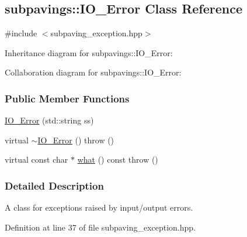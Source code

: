 \hypertarget{classsubpavings_1_1IO__Error}{\subsection{subpavings\-:\-:\-I\-O\-\_\-\-Error \-Class \-Reference}
\label{classsubpavings_1_1IO__Error}
}


{\ttfamily \#include $<$subpaving\-\_\-exception.\-hpp$>$}



\-Inheritance diagram for subpavings\-:\-:\-I\-O\-\_\-\-Error\-:


\-Collaboration diagram for subpavings\-:\-:\-I\-O\-\_\-\-Error\-:
\subsubsection*{\-Public \-Member \-Functions}
\begin{DoxyCompactItemize}
\item 
\hyperlink{classsubpavings_1_1IO__Error_a5235a4435e56d59ea8cfd39baaaf817f}{\-I\-O\-\_\-\-Error} (std\-::string ss)
\item 
virtual \hyperlink{classsubpavings_1_1IO__Error_a3ccb27166917cce4193a23a9f06659d6}{$\sim$\-I\-O\-\_\-\-Error} ()  throw ()
\item 
virtual const char $\ast$ \hyperlink{classsubpavings_1_1IO__Error_a1848498830bdc61ae199927ff944ad63}{what} () const   throw ()
\end{DoxyCompactItemize}


\subsubsection{\-Detailed \-Description}
\-A class for exceptions raised by input/output errors. 

\-Definition at line 37 of file subpaving\-\_\-exception.\-hpp.



